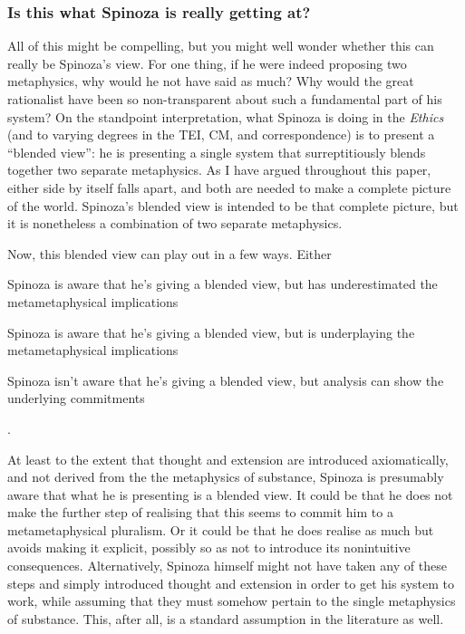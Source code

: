 \documentclass[11pt]{article}
\newcommand\texttitle[1]{\emph{#1}}
\begin{document}
	
	\subsubsection{Is this what Spinoza is really getting at?} \label{subsec:Blended}
	
	All of this might be compelling, but you might well wonder whether this can really be Spinoza's view. For one thing, if he were indeed proposing two metaphysics, why would he not have said as much? Why would the great rationalist have been so non-transparent about such a fundamental part of his system? On the standpoint interpretation, what Spinoza is doing in the \texttitle{Ethics} (and to varying degrees in the TEI, CM, and correspondence) is to present a \enquote{blended view}: he is presenting a single system that surreptitiously blends together two separate metaphysics. As I have argued throughout this paper, either side by itself falls apart, and both are needed to make a complete picture of the world. Spinoza's blended view is intended to be that complete picture, but it is nonetheless a combination of two separate metaphysics.
	
	Now, this blended view can play out in a few ways. Either
	\begin{enumerate*}[(a) ]
		\item \label{itm:Underestimated} Spinoza is aware that he's giving a blended view, but has underestimated the metametaphysical implications
		\item \label{itm:Underplaying} Spinoza is aware that he's giving a blended view, but is underplaying the metametaphysical implications
		\item \label{itm:Unaware} Spinoza isn't aware that he's giving a blended view, but analysis can show the underlying commitments
	\end{enumerate*}.
	
	At least to the extent that thought and extension are introduced axiomatically, and not derived from the the metaphysics of substance, Spinoza is presumably aware that what he is presenting is a blended view. It could be that he does not make the further step of realising that this seems to commit him to a metametaphysical pluralism. Or it could be that he does realise as much but avoids making it explicit, possibly so as not to introduce its nonintuitive consequences. Alternatively, Spinoza himself might not have taken any of these steps and simply introduced thought and extension in order to get his system to work, while assuming that they must somehow pertain to the single metaphysics of substance. This, after all, is a standard assumption in the literature as well.
	
\end{document}
